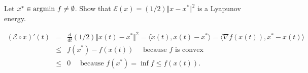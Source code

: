 \documentclass[a4paper,reqno,11pt]{amsart}
\begin{document}
\begin{exercise}
\notebf{*}
Let $x^* \in {\rm{argmin}}~f \neq \emptyset$.
Show that $\mathcal{E}(x) = (1/2)\Vert x - x^* \Vert^2$ is a Lyapunov energy.
\end{exercise}

\begin{correction}
\begin{eqnarray*}
(\mathcal{E} \circ x)'(t)
& = &
\frac{d}{dt} (1/2)\Vert x(t) - x^* \Vert^2
=
\langle \dot x(t), x(t) - x^* \rangle
= 
\langle \nabla f(x(t)), x^* - x(t) \rangle \\
& \leq & 
f(x^*) - f(x(t)) \quad \text{ because $f$ is convex} \\
& \leq & 
0 \quad \text{ because $f(x^*) = \inf f \leq f(x(t))$}.
\end{eqnarray*}
\end{correction}
\end{document}
